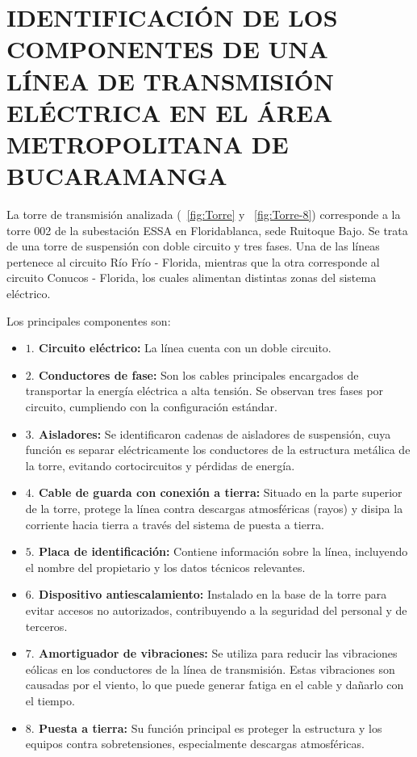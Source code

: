 \section{IDENTIFICACIÓN DE LOS COMPONENTES DE UNA LÍNEA DE TRANSMISIÓN ELÉCTRICA EN EL ÁREA METROPOLITANA DE BUCARAMANGA}

La torre de transmisión analizada (\figurename~\ref{fig:Torre} y \figurename~\ref{fig:Torre-8}) corresponde a la torre 002 de la subestación ESSA en Floridablanca, sede Ruitoque Bajo. Se trata de una torre de suspensión con doble circuito y tres fases. Una de las líneas pertenece al circuito Río Frío - Florida, mientras que la otra corresponde al circuito Conucos - Florida, los cuales alimentan distintas zonas del sistema eléctrico.

Los principales componentes son:

\begin{itemize}
    \item \textbf{$1.$ Circuito eléctrico:} La línea cuenta con un doble circuito.
    \item \textbf{$2.$ Conductores de fase:} Son los cables principales encargados de transportar la energía eléctrica a alta tensión. Se observan tres fases por circuito, cumpliendo con la configuración estándar.
    \item \textbf{$3.$ Aisladores:} Se identificaron cadenas de aisladores de suspensión, cuya función es separar eléctricamente los conductores de la estructura metálica de la torre, evitando cortocircuitos y pérdidas de energía.
    \item \textbf{$4.$ Cable de guarda con conexión a tierra:} Situado en la parte superior de la torre, protege la línea contra descargas atmosféricas (rayos) y disipa la corriente hacia tierra a través del sistema de puesta a tierra.
    \item \textbf{$5.$ Placa de identificación:} Contiene información sobre la línea, incluyendo el nombre del propietario y los datos técnicos relevantes.
    \item \textbf{$6.$ Dispositivo antiescalamiento:} Instalado en la base de la torre para evitar accesos no autorizados, contribuyendo a la seguridad del personal y de terceros.
    \item \textbf{$7.$ Amortiguador de vibraciones:} Se utiliza para reducir las vibraciones eólicas en los conductores de la línea de transmisión. Estas vibraciones son causadas por el viento, lo que puede generar fatiga en el cable y dañarlo con el tiempo.
    \item \textbf{$8.$ Puesta a tierra:} Su función principal es proteger la estructura y los equipos contra sobretensiones, especialmente descargas atmosféricas.
\end{itemize}



